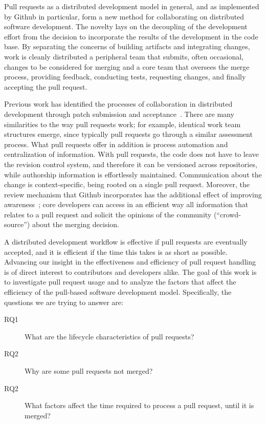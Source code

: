 \documentclass{sig-alternate}
\begin{document}
Pull requests as a distributed development model in general, and as implemented
by Github in particular, form a new method for collaborating on distributed
software development. The novelty lays on the decoupling of the development
effort from the decision to incorporate the results of the development in the
code base. By separating the concerns of building artifacts and integrating
changes, work is cleanly distributed a peripheral team that submits, often
occasional, changes to be considered for merging and a core team that oversees
the merge process, providing feedback, conducting tests, requesting changes, and
finally accepting the pull request.

Previous work has identified the processes of collaboration in distributed
development through patch submission and acceptance~\cite{MOCKU02, Bird07,
Weiss08}. There are many similarities to the way pull requests work; for
example, identical work team structures emerge, since typically pull requests go
through a similar assessment process. What pull requests offer in addition is
process automation and centralization of information. With pull requests, the
code does not have to leave the revision control system, and therefore it can be
versioned across repositories, while authorship information is effortlessly
maintained. Communication about the change is context-specific, being rooted on
a single pull request. Moreover, the review mechanism that Github incorporates
has the additional effect of improving awareness~\cite{Dabbi12}; core developers
can access in an efficient way all information that relates to a pull request
and solicit the opinions of the community (``crowd-source'') about the merging
decision.

A distributed development workflow is effective if pull requests are eventually
accepted, and it is efficient if the time this takes is as short as possible.
Advancing our insight in the effectiveness and efficiency of pull request
handling is of direct interest to contributors and developers alike. The goal
of this work is to investigate pull request usage and to analyze the factors
that affect the efficiency of the pull-based software development model.
Specifically, the questions we are trying to answer are: 

\begin{description}

  \item[RQ1] What are the lifecycle characteristics of pull requests? 
    
  \item[RQ2] Why are some pull requests not merged?

  \item[RQ2] What factors affect the time required to process a pull request,
    until it is merged?

\end{description}
\end{document}
